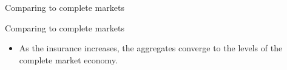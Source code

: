 \documentclass{beamer}
\begin{document}
\begin{frame}{Comparing to complete markets}

\end{frame}
  
    
\begin{frame}{Comparing to complete markets}
  \begin{itemize}
  
  \item {
  As the insurance increases, the aggregates converge to the levels of the complete market economy. 
  }


  \end{itemize} 
\end{frame}
\end{document}
